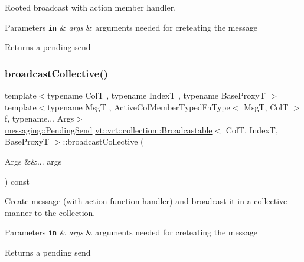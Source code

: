 Rooted broadcast with action member handler. 


\begin{DoxyParams}[1]{Parameters}
\mbox{\tt in}  & {\em args} & arguments needed for creteating the message\\
\hline
\end{DoxyParams}
\begin{DoxyReturn}{Returns}
a pending send 
\end{DoxyReturn}
\mbox{\label{structvt_1_1vrt_1_1collection_1_1_broadcastable_acef03dd57082f32556bef0e536a07fe9}} 
\subsubsection{\texorpdfstring{broadcast\+Collective()}{broadcastCollective()}\hspace{0.1cm}{\footnotesize\ttfamily [1/2]}}
{\footnotesize\ttfamily template$<$typename ColT , typename IndexT , typename Base\+ProxyT $>$ \\
template$<$typename MsgT , Active\+Col\+Member\+Typed\+Fn\+Type$<$ Msg\+T, Col\+T $>$ f, typename... Args$>$ \\
\hyperlink{structvt_1_1messaging_1_1_pending_send}{messaging\+::\+Pending\+Send} \hyperlink{structvt_1_1vrt_1_1collection_1_1_broadcastable}{vt\+::vrt\+::collection\+::\+Broadcastable}$<$ ColT, IndexT, Base\+ProxyT $>$\+::broadcast\+Collective (\begin{DoxyParamCaption}\item[{Args \&\&...}]{args }\end{DoxyParamCaption}) const}



Create message (with action function handler) and broadcast it in a collective manner to the collection. 


\begin{DoxyParams}[1]{Parameters}
\mbox{\tt in}  & {\em args} & arguments needed for creteating the message\\
\hline
\end{DoxyParams}
\begin{DoxyReturn}{Returns}
a pending send 
\end{DoxyReturn}
\mbox{\label{structvt_1_1vrt_1_1collection_1_1_broadcastable_acef03dd57082f32556bef0e536a07fe9}} 
